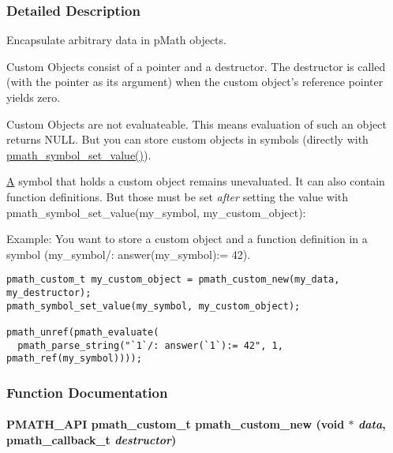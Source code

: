 \subsubsection{Detailed Description}
Encapsulate arbitrary data in pMath objects. 

Custom Objects consist of a pointer and a destructor. The destructor is called (with the pointer as its argument) when the custom object's reference pointer yields zero.

Custom Objects are not evaluateable. This means evaluation of such an object returns NULL. But you can store custom objects in symbols (directly with \hyperlink{group__symbols_g8344005c16b86be82d2efdedb0795a0c}{pmath\_\-symbol\_\-set\_\-value()}).

\hyperlink{class_a}{A} symbol that holds a custom object remains unevaluated. It can also contain function definitions. But those must be set {\em after\/} setting the value with pmath\_\-symbol\_\-set\_\-value(my\_\-symbol, my\_\-custom\_\-object):

Example: You want to store a custom object and a function definition in a symbol (my\_\-symbol/: answer(my\_\-symbol):= 42). 

\begin{Code}\begin{verbatim}pmath_custom_t my_custom_object = pmath_custom_new(my_data, my_destructor);
pmath_symbol_set_value(my_symbol, my_custom_object);

pmath_unref(pmath_evaluate(
  pmath_parse_string("`1`/: answer(`1`):= 42", 1, pmath_ref(my_symbol))));
\end{verbatim}
\end{Code}

 

\subsubsection{Function Documentation}
\hypertarget{group__custom_g2ffdd4054c43b543bed1e5238ab7342c}{
\paragraph[{pmath\_\-custom\_\-new}]{\setlength{\rightskip}{0pt plus 5cm}PMATH\_\-API {\bf pmath\_\-custom\_\-t} pmath\_\-custom\_\-new (void $\ast$ {\em data}, \/  {\bf pmath\_\-callback\_\-t} {\em destructor})}\hfill}
\label{group__custom_g2ffdd4054c43b543bed1e5238ab7342c}


